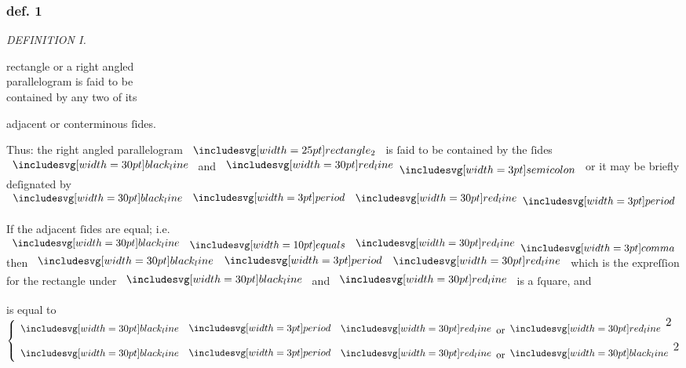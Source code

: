 \documentclass[11pt,preview]{standalone}
\begin{document}
\subsubsection{def. 1}

\begin{minipage}[t]{0.43\textwidth}
    \vspace{10pt}
    
\end{minipage}%
\hfill
\begin{minipage}[t]{0.54\textwidth}
    \begin{center}
        \textit{DEFINITION I.}\label{book2def1} \\
    \end{center}

    \hfill

    \begin{center}
        \raggedright \lettrine[lines=3, loversize=1, nindent=0pt]{}{} rectangle or a right angled\\ parallelogram is ſaid to be\\ contained by any two of its
    \end{center}
    adjacent or conterminous ſides.
\end{minipage}

\hfill

\hfill

\begin{center}
    Thus: the right angled parallelogram $\img{rectangle_2}$  is ſaid to be contained by the ſides $\blackline$ and $\redline \bsemicolon$ or it may be briefly deſignated by $\blackline \bmultiply \redline \bperiod$
\end{center}

\hfill

\begin{center}
    If the adjacent ſides are equal; i.e. $\blackline \bequals \redline \bcomma$ then $\blackline \bmultiply \redline$ which is the expreſſion for the rectangle under $\blackline$ and $\redline$ is a ſquare, and
\end{center}

\hfill

\begin{center}
    is equal to $\left\{\begin{aligned}\blackline & \bmultiply \redline \text{or} \redline^{\text{\large 2}} \\ \blackline & \bmultiply \redline \text{or} \blackline^{\text{\large 2}} \end{aligned}\right.$
\end{center}
\end{document}
